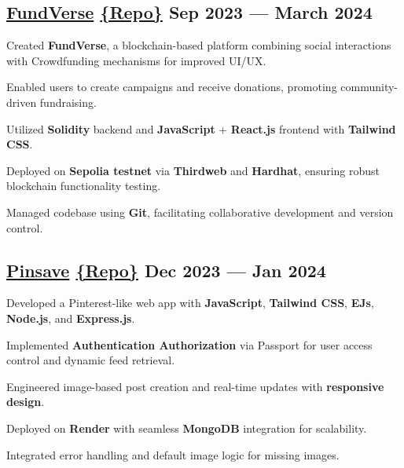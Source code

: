 \subsection{\href{https://fundverse-by-us.vercel.app/}{FundVerse} \href{https://github.com/thekiranmahajan/FundVerse}{\{Repo\}} \hfill Sep 2023 --- March 2024}
\begin{zitemize}
\item Created \textbf{FundVerse}, a blockchain-based platform combining social interactions with Crowdfunding mechanisms for improved UI/UX.
\item Enabled users to create campaigns and receive donations, promoting community-driven fundraising.
\item Utilized \textbf{Solidity} backend and \textbf{JavaScript} + \textbf{React.js} frontend with \textbf{Tailwind CSS}.
\item Deployed on \textbf{Sepolia testnet} via \textbf{Thirdweb} and \textbf{Hardhat}, ensuring robust blockchain functionality testing.
\item Managed codebase using \textbf{Git}, facilitating collaborative development and version control.
\end{zitemize}


\subsection{\href{https://pinsave-by-ray.onrender.com/}{Pinsave} \href{https://github.com/thekiranmahajan/pinsave}{\{Repo\}} \hfill Dec 2023 --- Jan 2024}
\begin{zitemize}
\item Developed a Pinterest-like web app with \textbf{JavaScript}, \textbf{Tailwind CSS}, \textbf{EJs}, \textbf{Node.js}, and \textbf{Express.js}.
\item Implemented \textbf{Authentication Authorization} via Passport for user access control and dynamic feed retrieval.
\item Engineered image-based post creation and real-time updates with \textbf{responsive design}.
\item Deployed on \textbf{Render} with seamless \textbf{MongoDB} integration for scalability.
\item Integrated error handling and default image logic for missing images.
\end{zitemize}
